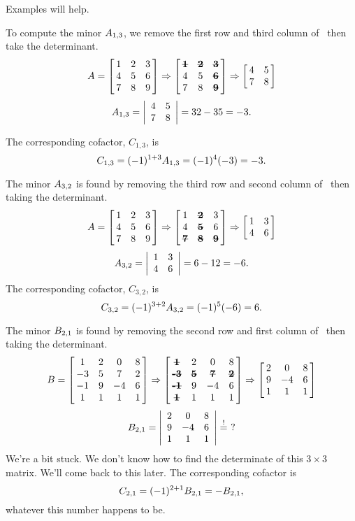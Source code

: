 Examples will help.\\

{To compute the minor $\tta_{1,3}$, we remove the first row and third column of \tta\ then take the determinant. 
$$\tta = \bmx{ccc}1&2&3\\4&5&6\\7&8&9\emx\Rightarrow\bmx{ccc}\textbf{\sout{1}}&\textbf{\sout{2}}&\textbf{\sout{3}}\\4&5&\textbf{\sout{6}}\\7&8&\textbf{\sout{9}}\emx\Rightarrow\bmx{cc}4&5\\7&8\emx $$
$$\tta_{1,3} = \bdt{cc}4&5\\7&8\edt = 32-35 = -3.$$
 
The corresponding cofactor, $C_{1,3}$, is
$$C_{1,3} = (-1)^{1+3}\tta_{1,3} = (-1)^4(-3) = -3.$$

The minor $\tta_{3,2}$ is found by removing the third row and second column of \tta\ then taking the determinant.
$$\tta = \bmx{ccc}1&2&3\\4&5&6\\7&8&9\emx\Rightarrow\bmx{ccc}1&\textbf{\sout{2}}&3\\4&\textbf{\sout{5}}&6\\ \textbf{\sout{7}}&\textbf{\sout{8}}&\textbf{\sout{9}}\emx\Rightarrow \bmx{cc}1&3\\4&6\emx$$
$$\tta_{3,2} = \bdt{cc}1&3\\4&6\edt = 6-12 = -6.$$ 
The corresponding cofactor, $C_{3,2}$, is
$$C_{3,2} = (-1)^{3+2}\tta_{3,2} = (-1)^5(-6) = 6.$$

\drawexampleline%

The minor $\ttb_{2,1}$ is found by removing the second row and first column of \ttb\ then taking the determinant.
$$\ttb = \bmx{cccc}1&2&0&8\\-3&5&7&2\\-1&9&-4&6\\1&1&1&1\emx \Rightarrow \bmx{cccc}\textbf{\sout{1}}&2&0&8\\ \textbf{\sout{-3}}&\textbf{\sout{5}}&\textbf{\sout{7}}&\textbf{\sout{2}}\\ \textbf{\sout{-1}}&9&-4&6\\ \textbf{\sout{1}}&1&1&1\emx \Rightarrow \bmx{ccc}2&0&8\\9&-4&6\\1&1&1\emx $$
$$\ttb_{2,1} = \bdt{ccc}2&0&8\\9&-4&6\\1&1&1\edt \stackrel{!}{=} \ ?$$
We're a bit stuck. We don't know how to find the determinate of this $3\times 3$ matrix. We'll come back to this later. The corresponding cofactor is
$$C_{2,1} = (-1)^{2+1}\ttb_{2,1} = -\ttb_{2,1},$$ whatever this number happens to be.


}
